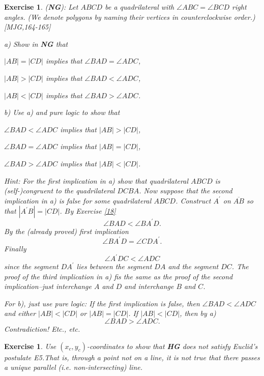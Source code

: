 \documentclass{article}%
\newtheorem{exercise}[theorem]{Exercise}
\begin{document}
\begin{exercise}
(\textbf{NG}): Let $ABCD$ be a quadrilateral with $\angle ABC=\angle BCD$
right angles. (We denote polygons by naming their vertices in counterclockwise
order.) [MJG,164-165]

a) Show in \textbf{NG} that

$\left\vert AB\right\vert =\left\vert CD\right\vert $ implies that $\angle
BAD=\angle ADC$,

$\left\vert AB\right\vert >\left\vert CD\right\vert $ implies that $\angle
BAD<\angle ADC$,

$\left\vert AB\right\vert <\left\vert CD\right\vert $ implies that $\angle
BAD>\angle ADC$.

b) Use a) and pure logic to show that

$\angle BAD<\angle ADC$ implies that $\left\vert AB\right\vert >\left\vert
CD\right\vert $,

$\angle BAD=\angle ADC$ implies that $\left\vert AB\right\vert =\left\vert
CD\right\vert $,

$\angle BAD>\angle ADC$ implies that $\left\vert AB\right\vert <\left\vert
CD\right\vert $.

Hint: For the first implication in a) show that quadrilateral $ABCD$ is
(self-)congruent to the quadrilateral $DCBA$. Now suppose that the second
implication in a) is false for some quadrilateral $ABCD$. Construct
$A^{\prime}$ on $\overline{AB}$ so that $\left\vert A^{\prime}B\right\vert
=\left\vert CD\right\vert $. $B$y Exercise \ref{18}%
\[
\angle BAD<\angle BA^{\prime}D.
\]
By the (already proved) first implication%
\[
\angle BA^{\prime}D=\angle CDA^{\prime}.
\]
Finally%
\[
\angle A^{\prime}DC<\angle ADC
\]
since the segment $DA^{\prime}$ lies between the segment $DA$ and the segment
$DC$. The proof of the third implication in a) fis the same as the proof of
the second implication--just interchange $A$ and $D$ and interchange $B$ and
$C$.

For b), just use pure logic: If the first implication is false, then $\angle
BAD<\angle ADC$ and either $\left\vert AB\right\vert <\left\vert CD\right\vert
$ or $\left\vert AB\right\vert =\left\vert CD\right\vert $. If $\left\vert
AB\right\vert <\left\vert CD\right\vert $, then by a)%
\[
\angle BAD>\angle ADC.
\]
Contradiction! Etc., etc.
\end{exercise}

\begin{exercise}
Use $\left(  x_{c},y_{c}\right)  $-coordinates to show that \textbf{HG} does
not satisfy Euclid's postulate E5.That is, through a point not on a line, it
is not true that there passes a unique parallel (i.e. non-intersecting) line.
\end{exercise}
\end{document}
